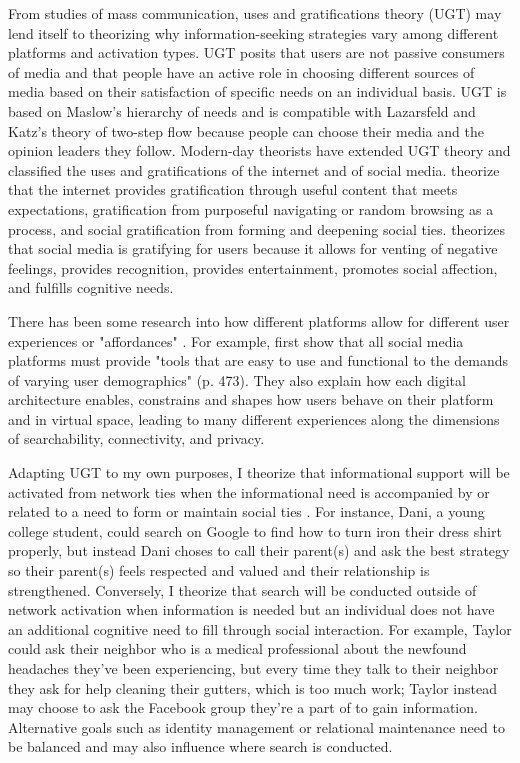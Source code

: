 From studies of mass communication, uses and gratifications theory (UGT)
\citep{blumlerUsesMassCommunications1974, tanMassCommunicationTheories1985} may
lend itself to theorizing why information-seeking strategies vary among different
platforms and activation types. UGT posits that users are not passive
consumers of media and that people have an active role in choosing different
sources of media based on their satisfaction of specific needs on an individual
basis. UGT is based on Maslow's \citeyearpar{maslowTheoryHumanMotivation1943}
hierarchy of needs and is compatible with Lazarsfeld and Katz's theory of
two-step flow because people can choose their media and the opinion leaders they
follow. Modern-day theorists have extended UGT theory and classified the uses
and gratifications of the internet and of social media.
\citet{staffordDeterminingUsesGratifications2004} theorize that the internet
provides gratification through useful content that meets expectations,
gratification from purposeful navigating or random browsing as a process, and
social gratification from forming and deepening social ties.
\citet{leungGenerationalDifferencesContent2013} theorizes that social media is
gratifying for users because it allows for venting of negative feelings,
provides recognition, provides entertainment, promotes social affection, and
fulfills cognitive needs. 

There has been some research into how different platforms allow for different user 
experiences or "affordances" \citep{boyd2010social}. For example, 
\citet{bossetta18} first show
that all social media platforms must provide "tools that are easy to use and 
functional to the demands of varying user demographics" (p. 473). They also
explain how each digital architecture enables, constrains and shapes how users
behave on their platform and in virtual space, leading to many different experiences 
along the dimensions of searchability, connectivity, and privacy. 

Adapting UGT to my own purposes, I theorize that
informational support will be activated from network ties when the informational
need is accompanied by or related to a need to form or maintain social ties
\citep{baumeister,grieve2013face}. For instance, Dani, a young college student, 
could search on Google to find how to turn iron their dress shirt properly, 
but instead Dani choses to call their parent(s) and ask the best strategy so their parent(s)
feels respected and valued and their relationship is strengthened. 
Conversely, I theorize that search will be conducted outside of network
activation when information is needed but an individual does not have 
an additional cognitive need to fill through social interaction. 
For example, Taylor could ask their neighbor who is a medical professional about 
the newfound headaches they've been experiencing, but every time they talk to their
neighbor they ask for help cleaning their gutters, which is too much work; Taylor
instead may choose to ask the Facebook group they're a part of to gain information.
Alternative goals such as identity management or relational maintenance
\citep{brashersInformationSeekingAvoiding2002} need to be balanced and may also
influence where search is conducted.

